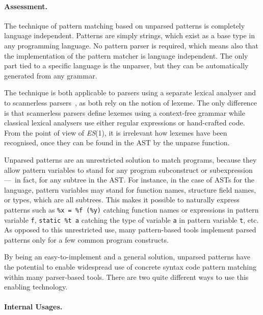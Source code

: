 \paragraph{Assessment.}

The technique of pattern matching based on unparsed patterns is
completely language independent. Patterns are simply strings, which
exist as a base type in any programming language. No pattern parser is
required, which means also that the implementation of the pattern
matcher is language independent. The only part tied to a specific
language is the unparser, but they can be automatically generated from
any grammar.

The technique is both applicable to parsers using a separate lexical
analyser and to scannerless parsers~\cite{scannerless}, as both rely
on the notion of lexeme. The only difference is that scannerless
parsers define lexemes using a context\hyp{}free grammar while
classical lexical analysers use either regular expressions or
hand\hyp{}crafted code. From the point of view of \textit{ES}(1), it
is irrelevant how lexemes have been recognised, once they can be found
in the AST by the unparse function.

Unparsed patterns are an unrestricted solution to match programs,
because they allow pattern variables to stand for any program
sub\-construct or sub\-expression ---~in fact, for any subtree in the
AST.  For instance, in the case of ASTs for the \Clang language,
pattern variables may stand for function names, structure field names,
or types, which are all subtrees. This makes it possible to naturally
express patterns such as \texttt{\%x = \%f (\%y)} catching function
names or expressions in pattern variable \texttt{f}, \texttt{static
\%t a} catching the type of variable \texttt{a} in pattern variable
\texttt{t}, etc. As opposed to this unrestricted use, many
pattern\hyp{}based tools implement parsed patterns only for a few
common program constructs.

By being an easy\hyp{}to\hyp{}implement and a general solution,
unparsed patterns have the potential to enable widespread use of
concrete syntax code pattern matching within many parser\hyp{}based
tools. There are two quite different ways to use this enabling
technology.

\paragraph{Internal Usages.}

